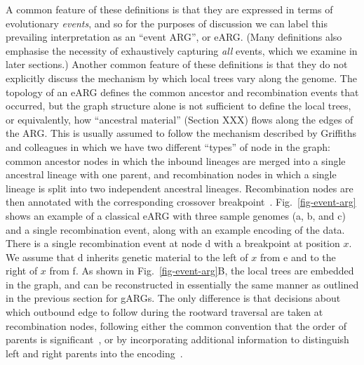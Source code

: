 \documentclass{article}
\newcommand{\noderef}[1]{\textsf{#1}}
\begin{document}
A common feature of these definitions is that they are expressed
in terms of evolutionary \emph{events}, and so for the purposes of
discussion we can label
this prevailing interpretation as an ``event ARG'', or eARG.
(Many definitions also emphasise
the necessity of exhaustively capturing \emph{all} events, which we
examine in later sections.)
Another common feature of these definitions is that they do not explicitly
discuss the mechanism by which local trees vary along the genome.
The topology of an eARG defines the common ancestor and
recombination events that occurred,
but the graph structure alone is not sufficient to define the local trees,
or equivalently, how ``ancestral material'' (Section XXX) flows along
the edges of the ARG.
This is usually assumed to follow the mechanism described by
Griffiths and colleagues in which we have
two different ``types'' of node in the graph:
common ancestor nodes in which the inbound lineages are merged into a
single ancestral lineage with one parent, and recombination
nodes in which a single lineage is split into two independent
ancestral lineages.
Recombination nodes are then
annotated with
the corresponding crossover breakpoint~\citep{griffiths1996ancestral}.
Fig.~\ref{fig-event-arg} shows an example of a classical
eARG with three sample genomes (\noderef{a}, \noderef{b}, and \noderef{c})
and a single recombination event,
along with an example encoding of the data.
There is a single recombination event
at node \noderef{d} with a breakpoint at position $x$. We
assume that \noderef{d} inherits genetic material to the
left of $x$ from \noderef{e} and to the right of $x$ from \noderef{f}.
As shown in Fig.~\ref{fig-event-arg}B,
the local trees are embedded in the graph, and can be reconstructed
in essentially the same manner as outlined in the previous section for
gARGs. The only difference is that decisions about which outbound
edge to follow during the rootward traversal are taken at recombination
nodes, following
either the common convention that the order of parents
is significant~\citep[e.g.][]{griffiths1991two},
or by incorporating additional information to
distinguish left and right parents
into the
encoding~\citep[e.g.][]{gusfield2014recombinatorics,ignatieva2021kwarg}.
\end{document}
